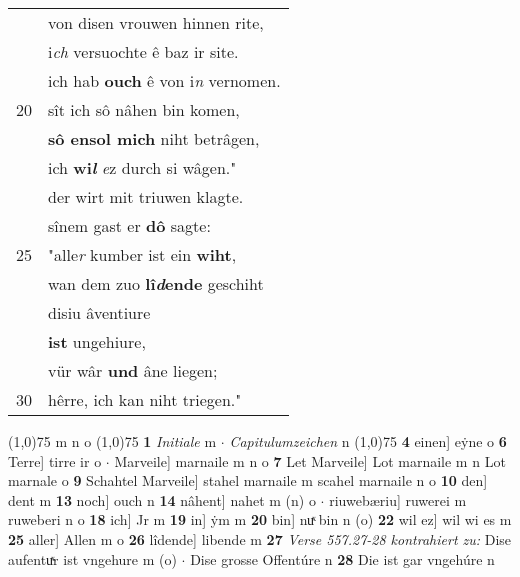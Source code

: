 \documentclass[8pt,a4paper,notitlepage]{article}
\begin{document}
\begin{table}[ht]
\begin{minipage}[t]{0.5\linewidth}
\begin{tabular}{rl}
 & von disen vrouwen hinnen rite,\\ 
 & i\textit{ch} versuochte ê baz ir site.\\ 
 & ich hab \textbf{ouch} ê von i\textit{n} vernomen.\\ 
20 & sît ich sô nâhen bin komen,\\ 
 & \textbf{sô ensol mich} niht betrâgen,\\ 
 & ich \textbf{wi\textit{l}} \textit{e}z durch si wâgen."\\ 
 & der wirt mit triuwen klagte.\\ 
 & sînem gast er \textbf{dô} sagte:\\ 
25 & "alle\textit{r} kumber ist ein \textbf{wiht},\\ 
 & wan dem zuo \textbf{lî\textit{d}ende} geschiht\\ 
 & disiu âventiure\\ 
 & \textbf{ist} ungehiure,\\ 
 & vür wâr \textbf{und} âne liegen;\\ 
30 & hêrre, ich kan niht triegen."\\ 
\end{tabular}
\scriptsize
\line(1,0){75} \newline
m n o \newline
\line(1,0){75} \newline
\textbf{1} \textit{Initiale} m   $\cdot$ \textit{Capitulumzeichen} n  \newline
\line(1,0){75} \newline
\textbf{4} einen] eẏne o \textbf{6} Terre] tirre ir o  $\cdot$ Marveile] marnaile m n o \textbf{7} Let Marveile] Lot marnaile m n Lot marnale o \textbf{9} Schahtel Marveile] stahel marnaile m scahel marnaile n o \textbf{10} den] dent m \textbf{13} noch] ouch n \textbf{14} nâhent] nahet m (n) o  $\cdot$ riuwebæriu] ruwerei m ruweberi n o \textbf{18} ich] Jr m \textbf{19} in] ẏm m \textbf{20} bin] nuͯ bin n (o) \textbf{22} wil ez] wil wi es m \textbf{25} aller] Allen m o \textbf{26} lîdende] libende m \textbf{27} \textit{Verse 557.27-28 kontrahiert zu:} Dise aufentuͯr ist vngehure m (o)   $\cdot$ Dise grosse Offentúre n \textbf{28} Die ist gar vngehúre n \newline
\end{minipage}
\end{table}
\newpage
\end{document}
